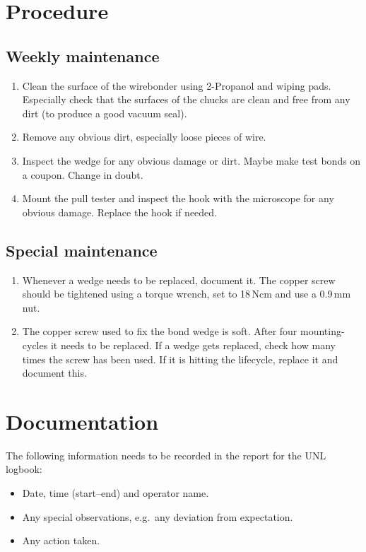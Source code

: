 \documentclass[12pt]{unlsilabsop}
\begin{document}
\section{Procedure}

\subsection{Weekly maintenance}
\begin{enumerate}
    \item Clean the surface of the wirebonder using 2-Propanol and wiping pads. Especially check that the surfaces of the chucks are clean and free from any dirt (to produce a good vacuum seal).
    \item Remove any obvious dirt, especially loose pieces of wire.
    \item Inspect the wedge for any obvious damage or dirt. Maybe make test bonds on a coupon. Change in doubt. 
    \item Mount the pull tester and inspect the hook with the microscope for any obvious damage. Replace the hook if needed.
\end{enumerate}

\subsection{Special maintenance}
\begin{enumerate}
    \item Whenever a wedge needs to be replaced, document it. The copper screw should be tightened using a torque wrench, set to 18\,Ncm and use a 0.9\,mm nut.
    \item The copper screw used to fix the bond wedge is soft. After four mounting-cycles it needs to be replaced. If a wedge gets replaced, check how many times the screw has been used. If it is hitting the lifecycle, replace it and document this.
\end{enumerate}

\section{Documentation}
The following information needs to be recorded in the report for the UNL logbook:
\begin{itemize}
    \item Date, time (start--end) and operator name.
    \item Any special observations, e.g.~any deviation from expectation.
    \item Any action taken.
\end{itemize}
\end{document}

